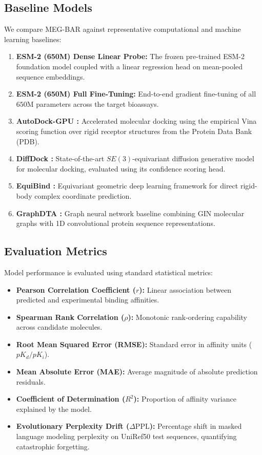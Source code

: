\documentclass{article}
\theoremstyle{definition}
\begin{document}
\subsection{Baseline Models}
We compare MEG-BAR against representative computational and machine learning baselines:
\begin{enumerate}[leftmargin=1.5em,noitemsep]
    \item \textbf{ESM-2 (650M) Dense Linear Probe:} The frozen pre-trained ESM-2 foundation model \citep{lin2023evolutionary} coupled with a linear regression head on mean-pooled sequence embeddings.
    \item \textbf{ESM-2 (650M) Full Fine-Tuning:} End-to-end gradient fine-tuning of all $650\text{M}$ parameters across the target bioassays.
    \item \textbf{AutoDock-GPU \citep{santos2021autodock}:} Accelerated molecular docking using the empirical Vina scoring function over rigid receptor structures from the Protein Data Bank (PDB).
    \item \textbf{DiffDock \citep{corso2023diffdock}:} State-of-the-art $SE(3)$-equivariant diffusion generative model for molecular docking, evaluated using its confidence scoring head.
    \item \textbf{EquiBind \citep{stark2022equibind}:} Equivariant geometric deep learning framework for direct rigid-body complex coordinate prediction.
    \item \textbf{GraphDTA \citep{nguyen2021graphdta}:} Graph neural network baseline combining GIN molecular graphs with 1D convolutional protein sequence representations.
\end{enumerate}

\subsection{Evaluation Metrics}
Model performance is evaluated using standard statistical metrics:
\begin{itemize}[leftmargin=1.5em,noitemsep]
    \item \textbf{Pearson Correlation Coefficient ($r$):} Linear association between predicted and experimental binding affinities.
    \item \textbf{Spearman Rank Correlation ($\rho$):} Monotonic rank-ordering capability across candidate molecules.
    \item \textbf{Root Mean Squared Error (RMSE):} Standard error in affinity units ($pK_d / pK_i$).
    \item \textbf{Mean Absolute Error (MAE):} Average magnitude of absolute prediction residuals.
    \item \textbf{Coefficient of Determination ($R^2$):} Proportion of affinity variance explained by the model.
    \item \textbf{Evolutionary Perplexity Drift ($\Delta \text{PPL}$):} Percentage shift in masked language modeling perplexity on UniRef50 test sequences, quantifying catastrophic forgetting.
\end{itemize}
\end{document}
